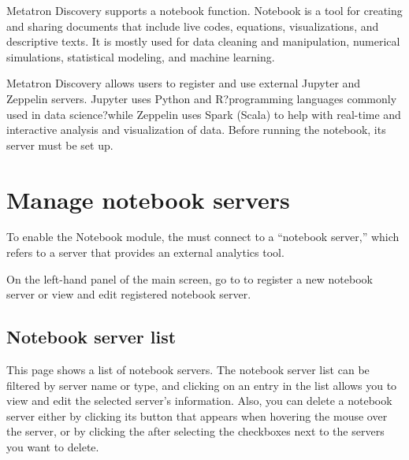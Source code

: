 \documentclass[letterpaper,10pt,english]{sphinxmanual}
\begin{document}
Metatron Discovery supports a notebook function. Notebook is a tool for creating and sharing documents that include live codes, equations, visualizations, and descriptive texts. It is mostly used for data cleaning and manipulation, numerical simulations, statistical modeling, and machine learning.

Metatron Discovery allows users to register and use external Jupyter and Zeppelin servers. Jupyter uses Python and R?programming languages commonly used in data science?while Zeppelin uses Spark (Scala) to help with real-time and interactive analysis and visualization of data. Before running the notebook, its server must be set up.


\section{Manage notebook servers}
\label{\detokenize{discovery/part05/notebook_management:id1}}\label{\detokenize{discovery/part05/notebook_management::doc}}
To enable the Notebook module, the  must connect to a “notebook server,”  which refers to a server that provides an external analytics tool.

On the left-hand panel of the main screen, go to  to register a new notebook server or view and edit registered notebook server.
\begin{quote}

\begin{figure}[H]
\centering

\noindent{}
\end{figure}
\end{quote}


\subsection{Notebook server list}
\label{\detokenize{discovery/part05/notebook_management:id2}}
This page shows a list of notebook servers. The notebook server list can be filtered by server name or type, and clicking on an entry in the list allows you to view and edit the selected server’s information. Also, you can delete a notebook server either by clicking its  button that appears when hovering the mouse over the server, or by clicking the  after selecting the checkboxes next to the servers you want to delete.
\begin{quote}

\begin{figure}[H]
\centering

\noindent{}
\end{figure}
\end{quote}
\end{document}
